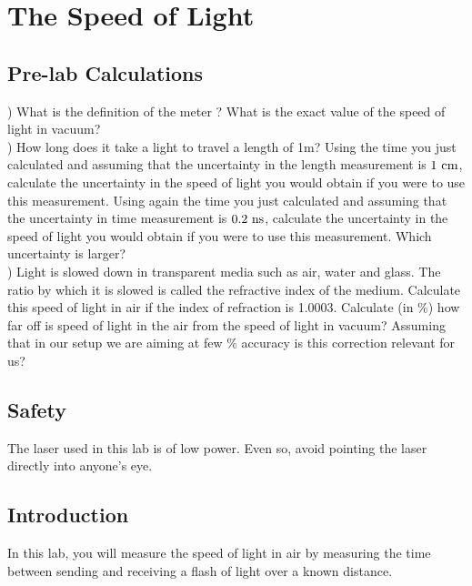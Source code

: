\chapter{The Speed of Light}

\section{Pre-lab Calculations}

) What is the definition of the meter ? What is the exact value of the speed of light in vacuum?\\

) How long does it take a light to travel a length of 1m? Using the
time you just calculated and assuming that the uncertainty in the
length measurement is $1~\rm cm$, calculate the uncertainty in the
speed of light you would obtain if you were to use this measurement.
Using again the time you just calculated and assuming that the
uncertainty in time measurement is $0.2~\rm ns$, calculate the
uncertainty in the speed of light you would obtain if you were to use
this measurement. Which uncertainty is larger? \\


) Light is slowed down in transparent media such as air, water and
glass.  The ratio by which it is slowed is called the refractive index
of the medium. Calculate this speed of light in air if the index of
refraction is 1.0003. Calculate (in \%) how far off is speed of light
in the air from the speed of light in vacuum? Assuming that in our
setup we are aiming at few $\%$ accuracy is this correction relevant
for us?\\

\section{Safety}
The laser used in this lab is of low power.  Even so, avoid pointing the laser directly into anyone's eye.

\section{Introduction}

In this lab, you will measure the speed of light in air by measuring
the time between sending and receiving a flash of light over a known
distance.  

